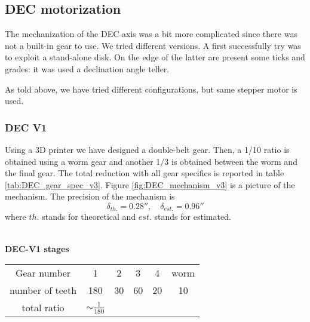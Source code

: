 \subsection{DEC motorization}
The mechanization of the DEC axis was a bit more complicated since there was not a built-in gear to use.
We tried different versions.
A first successfully try was to exploit a stand-alone disk.
On the edge of the latter are present some ticks and grades: it was used a declination angle teller.

As told above, we have tried different configurations, but same stepper motor is used.

\subsubsection{DEC V1}
Using a 3D printer we have designed a double-belt gear.
Then, a 1/10 ratio is obtained using a worm gear and another 1/3 is obtained between the worm and the final gear.
The total reduction with all gear specifics is reported in table \ref{tab:DEC_gear_spec_v3}.
Figure \ref{fig:DEC_mechanism_v3} is a picture of the mechanism.
The precision of the mechanism is 
\[\delta_{th.}=0.28'',\quad \delta_{est.}=0.96''\]
where \(th.\) stands for theoretical and \(est.\) stands for estimated.
\\
\\
\begin{minipage}
    {0.5\textwidth}
    \textbf{DEC-V1 stages}\\
    \centering
    \begin{tabular}{cccccc}
        \hline
        Gear number & 1 & 2 & 3 & 4 & worm\\
        number of teeth & 180 & 30 & 60 & 20 & 10\\
        \hline
        total ratio & \(\sim \frac{1}{180}\) &&&
    \end{tabular}
    \label{tab:DEC_gear_spec_v3}
\end{minipage}

